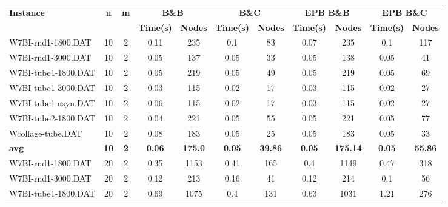 \begin{table}[!ht]
\centering
\hspace*{-1cm}\begin{tabular}{lcccccccccc}
\toprule
\textbf{Instance} & \textbf{n} & \textbf{m} & \multicolumn{2}{c}{\textbf{B\&B}} & \multicolumn{2}{c}{\textbf{B\&C}}  & \multicolumn{2}{c}{\textbf{EPB B\&B}} & \multicolumn{2}{c}{\textbf{EPB B\&C}} \\

\cmidrule(r){4-5} \cmidrule(r){6-7} \cmidrule(r){8-9} \cmidrule(r){10-11} 
~ & ~ & ~ & \textbf{Time(s)} &\textbf{Nodes} & \textbf{Time(s)} &\textbf{Nodes} & \textbf{Time(s)} &\textbf{Nodes} & \textbf{Time(s)} &\textbf{Nodes}  \\
\midrule

W7BI-rnd1-1800.DAT & 10 & 2 & 0.11 & 235 & 0.1 & 83 &  \textcolor{blue2}{0.07} & 235 & 0.1 & 117 \\
W7BI-rnd1-3000.DAT & 10 & 2 &  \textcolor{blue2}{0.05} & 137 &  \textcolor{blue2}{0.05} & 33 &  \textcolor{blue2}{0.05} & 138 &  \textcolor{blue2}{0.05} & 41 \\
W7BI-tube1-1800.DAT & 10 & 2 &  \textcolor{blue2}{0.05} & 219 &  \textcolor{blue2}{0.05} & 49 &  \textcolor{blue2}{0.05} & 219 &  \textcolor{blue2}{0.05} & 69 \\
W7BI-tube1-3000.DAT & 10 & 2 & 0.03 & 115 &  \textcolor{blue2}{0.02} & 17 & 0.03 & 115 &  \textcolor{blue2}{0.02} & 27 \\
W7BI-tube1-asyn.DAT & 10 & 2 & 0.06 & 115 &  \textcolor{blue2}{0.02} & 17 & 0.03 & 115 &  \textcolor{blue2}{0.02} & 27 \\
W7BI-tube2-1800.DAT & 10 & 2 &  \textcolor{blue2}{0.04} & 221 & 0.05 & 55 & 0.05 & 221 & 0.05 & 77 \\
Wcollage-tube.DAT & 10 & 2 & 0.08 & 183 &  \textcolor{blue2}{0.05} & 25 &  \textcolor{blue2}{0.05} & 183 &  \textcolor{blue2}{0.05} & 33 \\
\cline{1-11} \textbf{avg} & \textbf{10} & \textbf{2} & \textbf{0.06} & \textbf{175.0} & \textbf{0.05} & \textbf{39.86} & \textbf{0.05} & \textbf{175.14} & \textbf{0.05} & \textbf{55.86} \\ \cline{1-11}
W7BI-rnd1-1800.DAT & 20 & 2 &  \textcolor{blue2}{0.35} & 1153 & 0.41 & 165 & 0.4 & 1149 & 0.47 & 318 \\
W7BI-rnd1-3000.DAT & 20 & 2 & 0.12 & 213 & 0.16 & 41 & 0.12 & 214 &  \textcolor{blue2}{0.1} & 56 \\
W7BI-tube1-1800.DAT & 20 & 2 & 0.69 & 1075 &  \textcolor{blue2}{0.4} & 131 & 0.63 & 1031 & 1.21 & 276 \\

\end{tabular}
\end{table}
